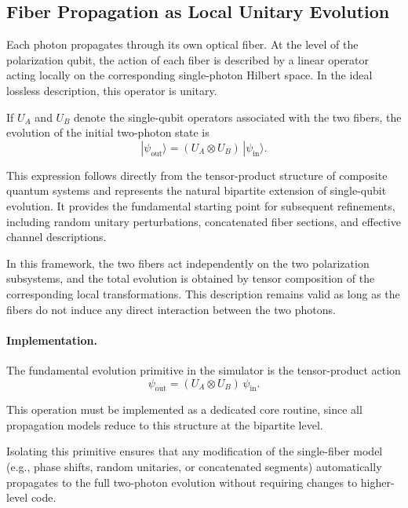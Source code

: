 \documentclass[a4paper]{article}
\begin{document}
\subsection{Fiber Propagation as Local Unitary Evolution}

Each photon propagates through its own optical fiber. At the level of the polarization qubit, the action of each fiber is described by a linear operator acting locally on the corresponding single-photon Hilbert space. In the ideal lossless description, this operator is unitary.

\medskip

If \( U_A \) and \( U_B \) denote the single-qubit operators associated with the two fibers, the evolution of the initial two-photon state is
\[
|\psi_{\mathrm{out}}\rangle
=
(U_A \otimes U_B)\, |\psi_{\mathrm{in}}\rangle.
\]

\medskip

This expression follows directly from the tensor-product structure of composite quantum systems and represents the natural bipartite extension of single-qubit evolution. It provides the fundamental starting point for subsequent refinements, including random unitary perturbations, concatenated fiber sections, and effective channel descriptions.

\medskip

In this framework, the two fibers act independently on the two polarization subsystems, and the total evolution is obtained by tensor composition of the corresponding local transformations. This description remains valid as long as the fibers do not induce any direct interaction between the two photons.

\medskip

\paragraph{Implementation.}

The fundamental evolution primitive in the simulator is the tensor-product action
\[
\psi_{\mathrm{out}} = (U_A \otimes U_B)\, \psi_{\mathrm{in}}.
\]

This operation must be implemented as a dedicated core routine, since all propagation models reduce to this structure at the bipartite level.

Isolating this primitive ensures that any modification of the single-fiber model (e.g., phase shifts, random unitaries, or concatenated segments) automatically propagates to the full two-photon evolution without requiring changes to higher-level code.
\end{document}
